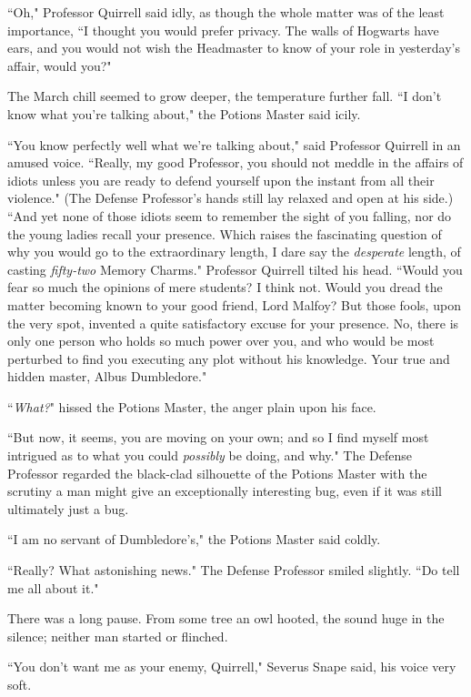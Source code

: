 ``Oh," Professor Quirrell said idly, as though the whole matter was of the least importance, ``I thought you would prefer privacy. The walls of Hogwarts have ears, and you would not wish the Headmaster to know of your role in yesterday's affair, would you?"

The March chill seemed to grow deeper, the temperature further fall. ``I don't know what you're talking about," the Potions Master said icily.

``You know perfectly well what we're talking about," said Professor Quirrell in an amused voice. ``Really, my good Professor, you should not meddle in the affairs of idiots unless you are ready to defend yourself upon the instant from all their violence." (The Defense Professor's hands still lay relaxed and open at his side.) ``And yet none of those idiots seem to remember the sight of you falling, nor do the young ladies recall your presence. Which raises the fascinating question of why you would go to the extraordinary length, I dare say the \emph{desperate} length, of casting \emph{fifty-two} Memory Charms." Professor Quirrell tilted his head. ``Would you fear so much the opinions of mere students? I think not. Would you dread the matter becoming known to your good friend, Lord Malfoy? But those fools, upon the very spot, invented a quite satisfactory excuse for your presence. No, there is only one person who holds so much power over you, and who would be most perturbed to find you executing any plot without his knowledge. Your true and hidden master, Albus Dumbledore."

``\emph{What?}" hissed the Potions Master, the anger plain upon his face.

``But now, it seems, you are moving on your own; and so I find myself most intrigued as to what you could \emph{possibly} be doing, and why." The Defense Professor regarded the black-clad silhouette of the Potions Master with the scrutiny a man might give an exceptionally interesting bug, even if it was still ultimately just a bug.

``I am no servant of Dumbledore's," the Potions Master said coldly.

``Really? What astonishing news." The Defense Professor smiled slightly. ``Do tell me all about it."

There was a long pause. From some tree an owl hooted, the sound huge in the silence; neither man started or flinched.

``You don't want me as your enemy, Quirrell," Severus Snape said, his voice very soft.

